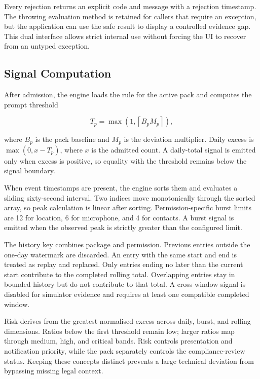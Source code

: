Every rejection returns an explicit code and message with a rejection timestamp. The throwing evaluation method is retained for callers that require an exception, but the application can use the safe result to display a controlled evidence gap. This dual interface allows strict internal use without forcing the UI to recover from an untyped exception.

\subsection{Signal Computation}

After admission, the engine loads the rule for the active pack and computes the prompt threshold

\begin{equation}
T_p=\max\left(1,\left\lceil B_pM_p\right\rceil\right),
\end{equation}

where \(B_p\) is the pack baseline and \(M_p\) is the deviation multiplier. Daily excess is \(\max(0,x-T_p)\), where \(x\) is the admitted count. A daily-total signal is emitted only when excess is positive, so equality with the threshold remains below the signal boundary.

When event timestamps are present, the engine sorts them and evaluates a sliding sixty-second interval. Two indices move monotonically through the sorted array, so peak calculation is linear after sorting. Permission-specific burst limits are 12 for location, 6 for microphone, and 4 for contacts. A burst signal is emitted when the observed peak is strictly greater than the configured limit.

The history key combines package and permission. Previous entries outside the one-day watermark are discarded. An entry with the same start and end is treated as replay and replaced. Only entries ending no later than the current start contribute to the completed rolling total. Overlapping entries stay in bounded history but do not contribute to that total. A cross-window signal is disabled for simulator evidence and requires at least one compatible completed window.

Risk derives from the greatest normalised excess across daily, burst, and rolling dimensions. Ratios below the first threshold remain low; larger ratios map through medium, high, and critical bands. Risk controls presentation and notification priority, while the pack separately controls the compliance-review status. Keeping these concepts distinct prevents a large technical deviation from bypassing missing legal context.

